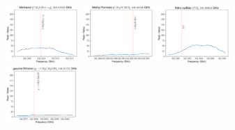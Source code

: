 \documentclass[12pt]{article}
\begin{document}
\begin{figure}
\includegraphics[width=0.245\textwidth]{spw3_CH3OHvt=0}
\includegraphics[width=0.245\textwidth]{spw3_CH3OCHO}
\includegraphics[width=0.245\textwidth]{spw3_NS}
\includegraphics[width=0.245\textwidth]{spw3_g-CH3CH2OH}
\end{figure}
\end{document}
